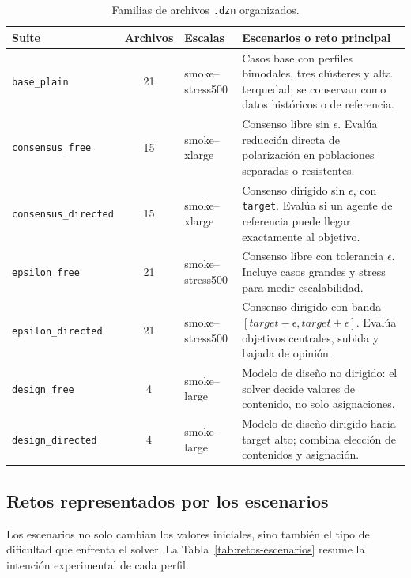 \documentclass[10pt,letterpaper]{article}
\begin{document}
\begin{table}[H]
\centering
\scriptsize
\caption{Familias de archivos \texttt{.dzn} organizados.}
\label{tab:familias-dzn}
\begin{tabularx}{\linewidth}{l c l Y}
\toprule
\textbf{Suite} & \textbf{Archivos} & \textbf{Escalas} & \textbf{Escenarios o reto principal} \\
\midrule
\texttt{base\_plain} & 21 & smoke--stress500 & Casos base con perfiles bimodales, tres cl\'usteres y alta terquedad; se conservan como datos hist\'oricos o de referencia. \\
\texttt{consensus\_free} & 15 & smoke--xlarge & Consenso libre sin \(\epsilon\). Eval\'ua reducci\'on directa de polarizaci\'on en poblaciones separadas o resistentes. \\
\texttt{consensus\_directed} & 15 & smoke--xlarge & Consenso dirigido sin \(\epsilon\), con \texttt{target}. Eval\'ua si un agente de referencia puede llegar exactamente al objetivo. \\
\texttt{epsilon\_free} & 21 & smoke--stress500 & Consenso libre con tolerancia \(\epsilon\). Incluye casos grandes y stress para medir escalabilidad. \\
\texttt{epsilon\_directed} & 21 & smoke--stress500 & Consenso dirigido con banda \([target-\epsilon,target+\epsilon]\). Eval\'ua objetivos centrales, subida y bajada de opini\'on. \\
\texttt{design\_free} & 4 & smoke--large & Modelo de dise\~no no dirigido: el solver decide valores de contenido, no solo asignaciones. \\
\texttt{design\_directed} & 4 & smoke--large & Modelo de dise\~no dirigido hacia target alto; combina elecci\'on de contenidos y asignaci\'on. \\
\bottomrule
\end{tabularx}
\end{table}

\subsection{Retos representados por los escenarios}

Los escenarios no solo cambian los valores iniciales, sino tambi\'en el tipo de dificultad que enfrenta el solver. La Tabla~\ref{tab:retos-escenarios} resume la intenci\'on experimental de cada perfil.
\end{document}
